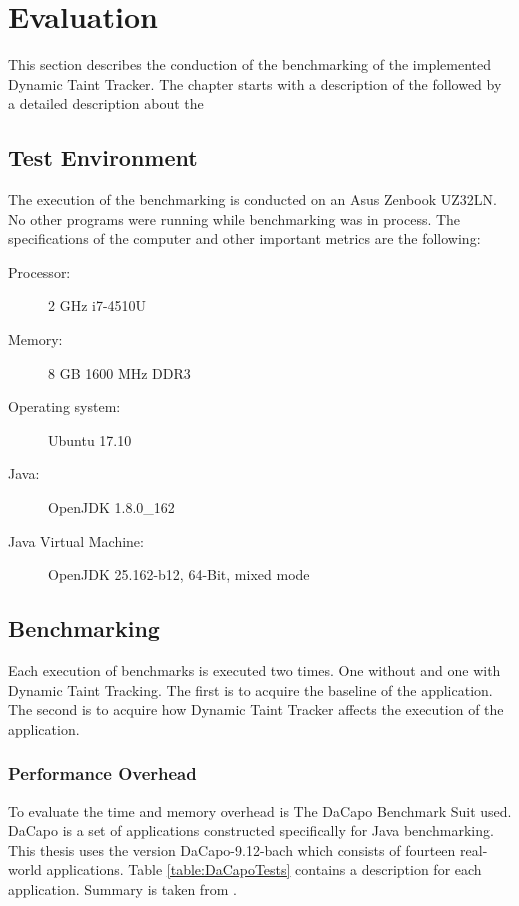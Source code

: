 \chapter{Evaluation}
This section describes the conduction of the benchmarking of the implemented Dynamic Taint Tracker. The chapter starts with a description of the \textit{} followed by a detailed description about the \textit{}



\section{Test Environment}
\label{TestEnvironment}
The execution of the benchmarking is conducted on an Asus Zenbook UZ32LN. No other programs were running while benchmarking was in process. The specifications of the computer and other important metrics are the following:

\begin{description}
    \item [Processor:] 2 GHz i7-4510U
    \item [Memory:] 8 GB 1600 MHz DDR3
    \item [Operating system:] Ubuntu 17.10
    \item [Java:] OpenJDK 1.8.0\_162
    \item [Java Virtual Machine:] OpenJDK 25.162-b12, 64-Bit, mixed mode
\end{description}



\section{Benchmarking}
\label{Benchmarking}
Each execution of benchmarks is executed two times. One without and one with Dynamic Taint Tracking. The first is to acquire the baseline of the application. The second is to acquire how Dynamic Taint Tracker affects the execution of the application.



\subsection{Performance Overhead}
To evaluate the time and memory overhead is The DaCapo Benchmark Suit \parencite{dacapo} used. DaCapo is a set of applications constructed specifically for Java benchmarking. This thesis uses the version DaCapo-9.12-bach which consists of fourteen real-world applications. Table \ref{table:DaCapoTests} contains a description for each application. Summary is taken from \textcite{dacapoBench}.

